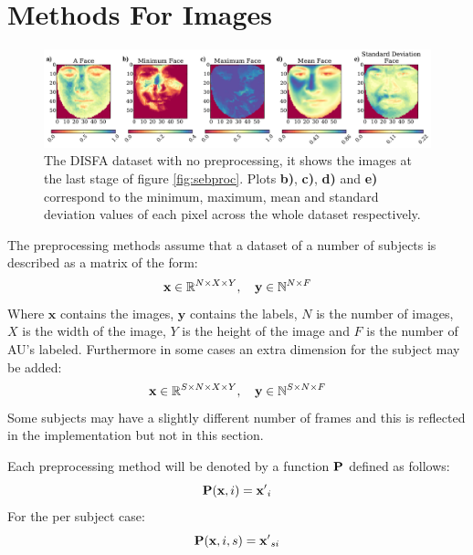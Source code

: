   \section{Methods For Images} \label{sec:methods}

    \begin{figure}[!h] \centering
    \includegraphics[width =\hsize]{figures/faces.pdf}
    \caption{The DISFA dataset with no preprocessing, it shows
    the images at the last stage of figure \ref{fig:sebproc}. Plots {\bf b)}, {\bf c)}, {\bf d)}
    and {\bf e)}
    correspond to the minimum, maximum, mean and standard deviation values of each pixel across
    the whole dataset respectively.} \label{fig:faces_none} \end{figure}

    The preprocessing methods assume that a dataset of a number of subjects
    is described as a matrix of the form:
    \begin{equation}
    {\bf x} \in \mathbb{R}^{N\times X \times Y},\quad {\bf y} \in \mathbb{N}^{N\times F}
    \end{equation}
    Where $\mathbf{x}$ contains the images, $\mathbf{y}$ contains the labels,
    $N$ is the number of images, $X$ is the width of the image, $Y$ is the height of the
    image and $F$ is the number of AU's labeled. Furthermore in some cases an extra dimension
    for the subject may be added:
    \begin{equation}
    {\bf x} \in \mathbb{R}^{S\times N\times X \times Y},\quad {\bf y} \in \mathbb{N}^{S\times N\times F}
    \end{equation}
    Some subjects may have a slightly different number of frames and this is reflected
    in the implementation but not in this section.

    Each preprocessing method will be denoted by a function ${\bf P}$ defined as follows:
    \begin{equation}
      {\bf P}({\bf x},i) = {\bf x'}_i
    \end{equation}
    For the per subject case:
    \begin{equation}
      {\bf P}({\bf x},i,s) = {\bf x'}_{si}
    \end{equation}

